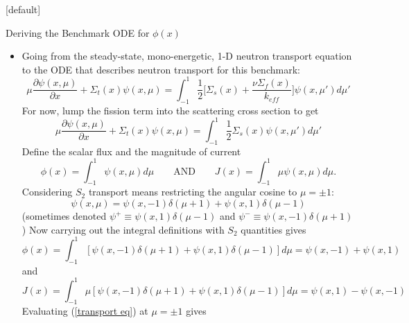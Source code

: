 \documentclass[9pt,t]{beamer}
\makeatletter
\newcommand{\QAND}{\qquad \text{AND} \qquad}
\newenvironment{withoutheadline}{
       \setbeamertemplate{headline}[default]
       \def\beamer@entrycode{\vspace*{-\headheight}}
    }{}
\makeatother
\begin{document}
\begin{withoutheadline}
\begin{frame}[allowframebreaks]{Deriving the Benchmark ODE for $\phi(x)$}
    \begin{itemize}
        \item Going from the steady-state, mono-energetic, 1-D neutron transport equation to the ODE that describes neutron transport for this benchmark:
        \begin{equation}
            \mu \frac{\partial \psi(x,\mu)}{\partial x} + \Sigma_{t}(x)\psi(x,\mu) =
            \int_{-1}^{1} \frac{1}{2}\big[\Sigma_{s}(x) + \frac{\nu \Sigma_{f}(x)}{k_{eff}}\big] \psi(x,\mu')d\mu'
        \end{equation}
        For now, lump the fission term into the scattering cross section to get
        \begin{equation} \label{transport eq}
            \mu \frac{\partial \psi(x,\mu)}{\partial x} + \Sigma_{t}(x)\psi(x,\mu) =
            \int_{-1}^{1} \frac{1}{2}\Sigma_{s}(x) \psi(x,\mu')d\mu'
        \end{equation}
        Define the scalar flux and the magnitude of current
        \begin{equation}
            \phi(x) = \int_{-1}^{1} \psi(x,\mu) d\mu \QAND J(x) = \int_{-1}^{1} \mu \psi(x,\mu) d\mu.
        \end{equation}
        Considering $S_{2}$ transport means restricting the angular cosine to $\mu = \pm 1$:
        \begin{equation}
            \psi(x,\mu) = \psi(x,-1) \delta(\mu+1) + \psi(x,1) \delta(\mu-1)
        \end{equation}
        (sometimes denoted $\psi^{+}\equiv \psi(x,1) \delta(\mu-1) $ and $\psi^{-}\equiv \psi(x,-1) \delta(\mu+1) $)
        \newpage
        Now carrying out the integral definitions with $S_{2}$ quantities gives
        \begin{equation} \label{scalar flux}
            \phi(x) = \int_{-1}^{1} \left\lbrack \psi(x,-1) \delta(\mu+1) + \psi(x,1) \delta(\mu-1) \right\rbrack d\mu =
            \psi(x,-1) + \psi(x,1)
        \end{equation}
        and
        \begin{equation} \label{current}
            J(x) = \int_{-1}^{1} \mu \left\lbrack \psi(x,-1) \delta(\mu+1) + \psi(x,1) \delta(\mu-1) \right\rbrack d\mu =
            \psi(x,1) - \psi(x,-1)
        \end{equation}
        Evaluating (\ref{transport eq}) at $\mu=\pm 1$ gives

\end{itemize}
\end{frame}
\end{withoutheadline}
\end{document}
